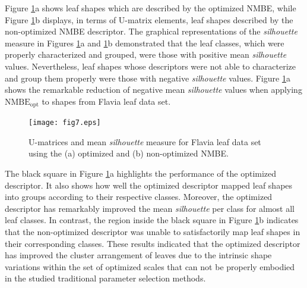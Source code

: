 {{Figure \ref{fig:MatrizU_leaves_256}a shows leaf shapes which are described by the optimized NMBE, while Figure \ref{fig:MatrizU_leaves_256}b displays, in terms of U-matrix elements, leaf shapes described by the non-optimized NMBE descriptor.  The graphical representations of the \emph{silhouette}  measure in Figures \ref{fig:MatrizU_leaves_256}a and \ref{fig:MatrizU_leaves_256}b demonstrated that the leaf classes, which were properly characterized and grouped, were those with positive mean \emph{silhouette} values. Nevertheless, leaf shapes whose descriptors were not able to characterize and group them properly were those with negative  \emph{silhouette} values. Figure \ref{fig:MatrizU_leaves_256}a shows the remarkable  reduction of negative mean \emph{silhouette} values when applying $\operatorname{NMBE_{opt}}$ to shapes from Flavia leaf data set. 

\begin{figure}[t]
\centering
\texttt{[image: fig7.eps]}
 \caption{\label{fig:MatrizU_leaves_256}U-matrices and mean \emph{silhouette} measure for Flavia leaf data set using the (a) optimized and (b) non-optimized NMBE.}
\end{figure}

The black square in Figure \ref{fig:MatrizU_leaves_256}a highlights  the performance of the optimized descriptor. It also shows how well the optimized descriptor mapped leaf shapes into groups according to their respective classes.  Moreover, the optimized descriptor has remarkably improved  the mean \emph{silhouette} per class for almost all leaf classes. In contrast, the region inside the black square in Figure \ref{fig:MatrizU_leaves_256}b indicates that the non-optimized descriptor was unable to satisfactorily map leaf shapes in their corresponding classes.
These results  indicated that the optimized descriptor has improved the cluster arrangement of leaves due to the intrinsic shape variations within the set of optimized scales that can not be properly embodied in the studied traditional parameter selection methods.

}}
